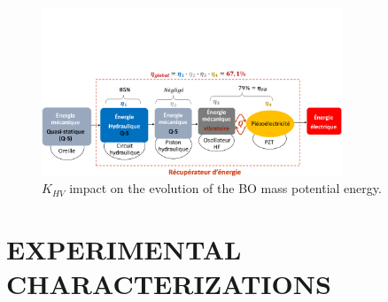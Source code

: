 \documentclass[3p,twocolumn,preprint]{elsarticle}
\begin{document}
\begin{figure}[!htbp]
	\centering
	\captionsetup{justification=centering}
	\includegraphics[trim={0cm 0cm 0cm 7cm},clip, width=0.8\textwidth]{figures/conversion_symme_rendements.pdf}
	\caption{$K_{HV}$ impact on the evolution of the BO mass potential energy.}
	\label{fig:conversion_symme_rendements.pdf}
\end{figure}
\section{EXPERIMENTAL CHARACTERIZATIONS}
\label{sec:EXPERIMENTAL CHARACTERIZATIONS}
\lipsum[2]
\end{document}
